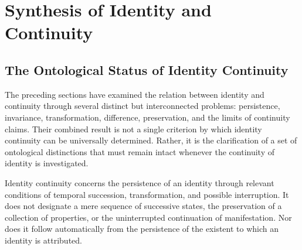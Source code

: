 %
%

\section{Synthesis of Identity and Continuity}
\label{sec:synthesis-of-identity-and-continuity}

\subsection{The Ontological Status of Identity Continuity}

The preceding sections have examined the relation between identity and continuity
through several distinct but interconnected problems: persistence, invariance,
transformation, difference, preservation, and the limits of continuity claims.
Their combined result is not a single criterion by which identity continuity can
be universally determined. Rather, it is the clarification of a set of
ontological distinctions that must remain intact whenever the continuity of
identity is investigated.

Identity continuity concerns the persistence of an identity through relevant
conditions of temporal succession, transformation, and possible interruption.
It does not designate a mere sequence of successive states, the preservation of
a collection of properties, or the uninterrupted continuation of manifestation.
Nor does it follow automatically from the persistence of the existent to which
an identity is attributed.

